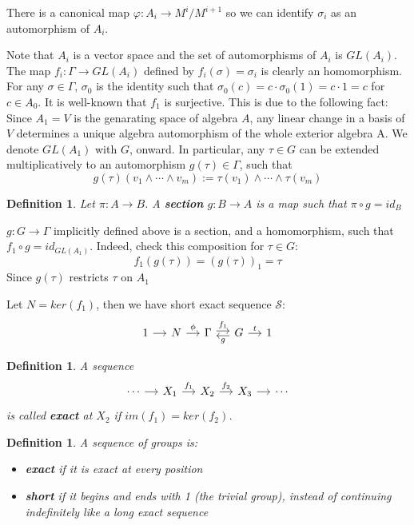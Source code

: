 \documentclass[12pt]{article}
\newtheorem{definition}[theorem]{Definition}
\numberwithin{theorem}{section}
\numberwithin{equation}{theorem}
\begin{document}
There is a canonical map $\varphi : A_i \to M^i/M^{i+1}$ so we can identify $\sigma_i$ as an automorphism of $A_i$.

Note that $A_i$ is a vector space and the set of automorphisms of $A_i$ is $GL(A_i)$. The map $f_i : \Gamma \to GL(A_i)$ defined by $f_i(\sigma) = \sigma_i$ is clearly an homomorphism. For any $\sigma \in \Gamma$, $\sigma_0$ is the identity such that $\sigma_0(c) = c\cdot\sigma_0(1) = c \cdot 1 = c$ for $c \in A_0$. It is well-known that $f_1$ is surjective. This is due to the following fact: Since $A_1 = V$ is the genarating space of algebra $A$, any linear change in a basis of $V$ determines a unique algebra automorphism of the whole exterior algebra A. We denote $GL(A_1)$ with $G$, onward. In particular, any $\tau \in G$ can be extended multiplicatively to an automorphism $g(\tau) \in \Gamma$, such that $$g(\tau)(v_1 \wedge \cdots \wedge v_m) := \tau(v_1) \wedge \cdots \wedge \tau(v_m) $$

\begin{definition}
    Let $\pi : A \to B$. A \textbf{section} $g : B \to A$ is a map such that $\pi \circ g = id_B$
\end{definition}

$g : G \to \Gamma$ implicitly defined above is a section, and a homomorphism, such that $f_1 \circ g = id_{GL(A_1)}$. Indeed, check this composition for $\tau \in G$:
$$
f_1(g(\tau)) = (g(\tau))_1 = \tau
$$
Since $g(\tau)$ restricts $\tau$ on $A_1$

Let $N = ker(f_1)$, then we have short exact sequence $\mathcal{S}$:
$$
\begin{tikzcd}[row sep = small, column sep = small]
1 \arrow{r} & N \arrow{r}{\phi} & \Gamma \arrow[r, shift left=0.5ex, "f_1"] & \arrow[l, shift left=0.5ex, "g"] G \arrow{r}{t} & 1
\end{tikzcd}
$$

\begin{definition}
A sequence 
$$
\begin{tikzcd}[row sep = small, column sep = small]
\cdots \arrow{r} & X_1 \arrow{r}{f_1} & X_2 \arrow{r}{f_2} & X_3 \arrow{r} & \cdots
\end{tikzcd}
$$
is called \textbf{exact} at $X_2$ if $im(f_1) = ker(f_2)$.
\end{definition}
\begin{definition}
A sequence of groups is:
\begin{itemize}
    \item \textbf{exact} if it is exact at every position 
    \item \textbf{short} if it begins and ends with 1 (the trivial group), instead of continuing indefinitely like a long exact sequence
\end{itemize}
\end{definition}
\end{document}
